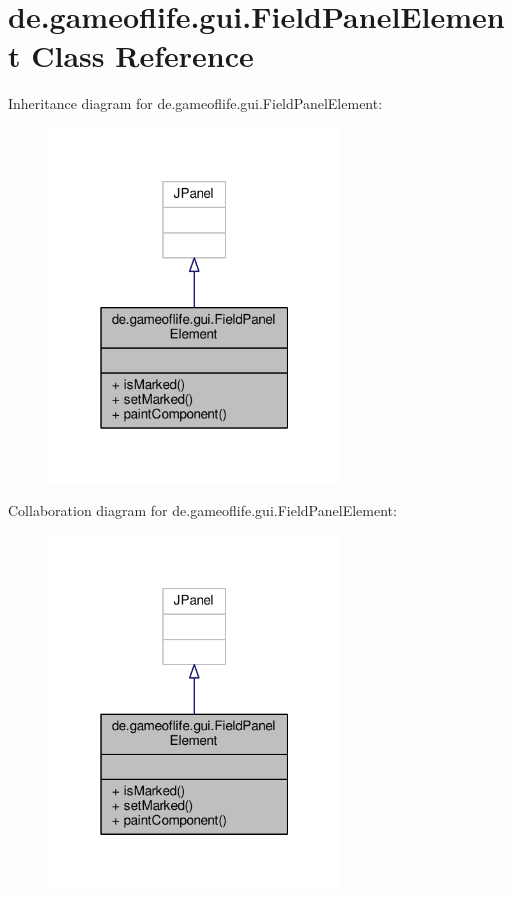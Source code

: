 \hypertarget{classde_1_1gameoflife_1_1gui_1_1FieldPanelElement}{\section{de.\-gameoflife.\-gui.\-Field\-Panel\-Element Class Reference}
\label{classde_1_1gameoflife_1_1gui_1_1FieldPanelElement}
}


Inheritance diagram for de.\-gameoflife.\-gui.\-Field\-Panel\-Element\-:\nopagebreak
\begin{figure}[H]
\begin{center}
\leavevmode
\includegraphics[width=220pt]{classde_1_1gameoflife_1_1gui_1_1FieldPanelElement__inherit__graph}
\end{center}
\end{figure}


Collaboration diagram for de.\-gameoflife.\-gui.\-Field\-Panel\-Element\-:\nopagebreak
\begin{figure}[H]
\begin{center}
\leavevmode
\includegraphics[width=220pt]{classde_1_1gameoflife_1_1gui_1_1FieldPanelElement__coll__graph}
\end{center}
\end{figure}
